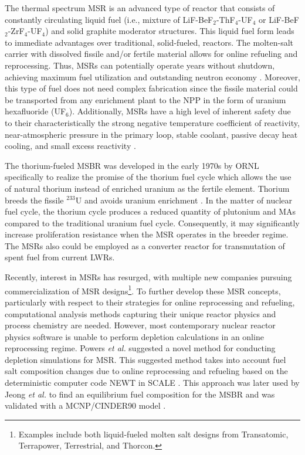 The thermal spectrum \gls{MSR} is an advanced type of reactor that consists of 
constantly circulating liquid fuel (i.e., mixture of LiF-BeF$_2$-ThF$_4$-UF$_4$ or 
LiF-BeF$_2$-ZrF$_4$-UF$_4$) and solid graphite moderator structures. This liquid 
fuel form leads to immediate advantages over traditional, 
solid-fueled, reactors. The molten-salt carrier with dissolved 
fissile and/or fertile material allows for online refueling and 
reprocessing. Thus, \glspl{MSR} can potentially operate years without shutdown, 
achieving maximum fuel utilization and outstanding neutron economy 
\cite{leblanc_molten_2010}. Moreover, this type of fuel does not need 
complex fabrication since the fissile material could be transported from any 
enrichment plant to the \gls{NPP} in the form 
of uranium hexafluoride (UF$_6$).  Additionally, \glspl{MSR} have a high level 
of inherent safety due to their characteristically 
the strong negative temperature coefficient of reactivity, near-atmospheric 
pressure in the primary loop, stable coolant, passive decay heat cooling, and 
small excess reactivity \cite{elsheikh_safety_2013}.

The thorium-fueled \gls{MSBR} was developed in the early 1970s by \gls{ORNL} 
specifically to realize the promise of the thorium fuel cycle which allows the 
use of natural thorium instead of enriched uranium as the fertile element. 
Thorium breeds the fissile $^{233}$U and avoids uranium enrichment 
\cite{robertson_conceptual_1971}. In the matter of nuclear fuel cycle, the 
thorium cycle produces a reduced quantity of plutonium and \glspl{MA} 
compared to the traditional uranium fuel cycle. Consequently, it may 
significantly increase proliferation resistance when the \gls{MSR} operates in the 
breeder regime. The \glspl{MSR} also could be employed as a converter reactor for 
transmutation of spent fuel from current \glspl{LWR}.

Recently, interest in \glspl{MSR} has resurged, with multiple new companies 
pursuing commercialization of \gls{MSR} designs\footnote{Examples include both 
liquid-fueled molten salt designs from Transatomic, Terrapower, Terrestrial, 
and Thorcon.}.
To further develop these \gls{MSR} concepts, particularly with respect to their  
strategies for online reprocessing and refueling, computational analysis methods capturing
their unique reactor physics and process chemistry are needed.
However, most contemporary nuclear reactor physics software is unable to 
perform depletion calculations in an online reprocessing 
regime. Powers \emph{et al.} suggested a novel method for conducting 
depletion simulations for \gls{MSR}. This suggested method takes into account 
fuel salt composition changes due to online 
reprocessing and refueling based on the deterministic computer code NEWT in 
SCALE \cite{powers_new_2013}. This approach was later used by Jeong \emph{et 
al.} to find an equilibrium fuel composition for the \gls{MSBR} and was 
validated with a \gls{MCNP}/CINDER90 model \cite{jeong_equilibrium_2016}. 

